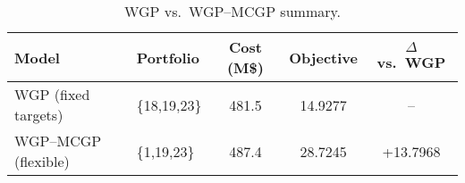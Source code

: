 \begin{table}[htbp]
\centering
\caption{WGP vs.\ WGP–MCGP summary.}
\label{tab:wgpMCGPSummary}
\begin{tabular}{l l c c c}
\hline
\textbf{Model} & \textbf{Portfolio} & \textbf{Cost (M\$)} & \textbf{Objective} & \(\Delta\) vs.\ WGP \\
\hline
WGP (fixed targets)   & \{18,19,23\} & 481.5 & 14.9277 & -- \\
WGP–MCGP (flexible)   & \{1,19,23\}  & 487.4 & 28.7245 & +13.7968 \\
\hline
\end{tabular}
\end{table}
